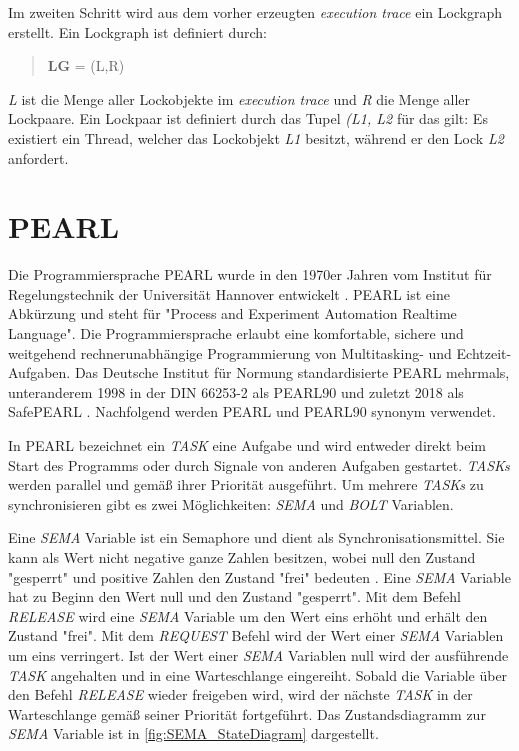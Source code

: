 Im zweiten Schritt wird aus dem vorher erzeugten \textit{execution trace} ein
Lockgraph erstellt. Ein Lockgraph ist definiert durch:
\begin{quote}
\textbf{LG} = (L,R)
\end{quote}
\textit{L} ist die Menge aller Lockobjekte im \textit{execution trace} und
\textit{R} die Menge aller Lockpaare. Ein Lockpaar ist definiert durch das Tupel
\textit{(L1, L2} für das gilt: Es existiert ein Thread, welcher das Lockobjekt
\textit{L1} besitzt, während er den Lock \textit{L2} anfordert.

\section{PEARL}
\label{section:PEARL}
Die Programmiersprache PEARL wurde in den 1970er Jahren vom Institut für
Regelungstechnik der Universität Hannover entwickelt \autocite{PEARLHistory}.
PEARL ist eine Abkürzung und steht für "Process and Experiment Automation
Realtime Language". Die Programmiersprache erlaubt eine komfortable, sichere und
weitgehend rechnerunabhängige Programmierung von Multitasking- und
Echtzeit-Aufgaben. Das Deutsche Institut für Normung standardisierte PEARL
mehrmals, unteranderem 1998 in der DIN 66253-2 als PEARL90
\autocite{DIN-66253-2:1998-04} und zuletzt 2018 als SafePEARL
\autocite{DIN-66253:2018-03}. Nachfolgend werden PEARL und PEARL90 synonym
verwendet. 

In PEARL bezeichnet ein \textit{TASK} eine Aufgabe und wird entweder direkt beim
Start des Programms oder durch Signale von anderen Aufgaben gestartet.
\textit{TASKs} werden parallel und gemäß ihrer Priorität ausgeführt. Um mehrere
\textit{TASKs} zu synchronisieren gibt es zwei Möglichkeiten: \textit{SEMA} und
\textit{BOLT} Variablen. 

Eine \textit{SEMA} Variable ist ein Semaphore und dient als
Synchronisationsmittel. Sie kann als Wert nicht negative ganze Zahlen besitzen,
wobei null den Zustand "gesperrt" und positive Zahlen den Zustand "frei"
bedeuten \autocite[9--17]{PEARL}. Eine \textit{SEMA} Variable hat zu Beginn den
Wert null und den Zustand "gesperrt". Mit dem Befehl \textit{RELEASE} wird eine
\textit{SEMA} Variable um den Wert eins erhöht und erhält den Zustand "frei".
Mit dem \textit{REQUEST} Befehl wird der Wert einer \textit{SEMA} Variablen um
eins verringert. Ist der Wert einer \textit{SEMA} Variablen null wird der
ausführende \textit{TASK} angehalten und in eine Warteschlange eingereiht.
Sobald die Variable über den Befehl \textit{RELEASE} wieder freigeben wird, wird
der nächste \textit{TASK} in der Warteschlange gemäß seiner Priorität
fortgeführt. Das Zustandsdiagramm zur \textit{SEMA} Variable ist in
\cref{fig:SEMA_StateDiagram} dargestellt.

